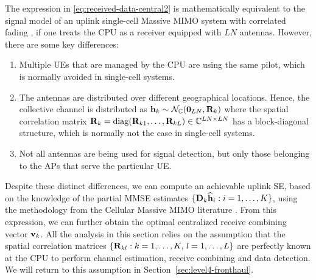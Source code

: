The expression in \eqref{eq:received-data-central2} is mathematically equivalent to the signal model of an uplink single-cell Massive MIMO system with correlated fading \cite[Sec.~2.3.1]{massivemimobook}, if one treats the CPU as a receiver equipped with $LN$ antennas. However, there are some key differences:
\begin{enumerate}
\item Multiple UEs that are managed by the CPU are using the same pilot, which is normally avoided in single-cell systems.

\item The antennas are distributed over different geographical locations. Hence, the collective channel is distributed as $\mathbf{h}_k \sim \mathcal{N}_{\mathbb{C}}(\mathbf{0}_{LN}, \mathbf{R}_{k})$ where the spatial correlation matrix $\mathbf{R}_{k} = \mathrm{diag}(\mathbf{R}_{k1}, \ldots,  \mathbf{R}_{kL}) \in \mathbb{C}^{LN \times LN}$ has a block-diagonal structure, which is normally not the case in single-cell systems.

\item Not all antennas are being used for signal detection, but only those belonging to the APs that serve the particular UE.
\end{enumerate}

Despite these distinct differences, we can compute an achievable uplink SE, based on the knowledge of the partial MMSE estimates $\{\mathbf{D}_{k}\widehat{\mathbf{h}}_{i} : i= 1, \ldots,K\}$, using the methodology from the Cellular Massive MIMO literature \cite[Sec.~4.1]{massivemimobook}. From this expression, we can further obtain the optimal centralized receive combining vector $\mathbf{v}_{k}$. All the analysis in this section relies on the assumption that the spatial correlation matrices $\{\mathbf{R}_{kl}: k=1,\ldots,K, \, l=1,\ldots,L\}$ are perfectly known at the CPU to perform channel estimation, receive combining and data detection. We will return to this assumption in Section~\ref{sec:level4-fronthaul}.

